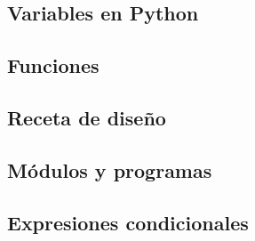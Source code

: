 \documentclass[12pt,xcolor={dvipsnames,x11names},t,table]{beamer}
\begin{document}
\subsection{Variables en Python}


\subsection{Funciones}




\subsection{Receta de diseño}


\subsection{Módulos y programas}



\subsection{Expresiones condicionales}





\end{document}
